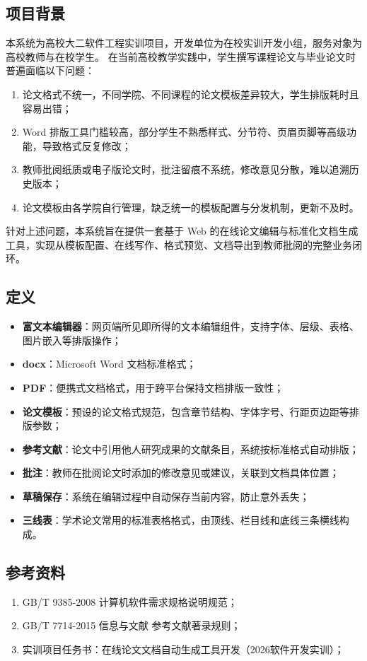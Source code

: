 \documentclass{softeng}
\begin{document}
\subsection{项目背景}
    本系统为高校大二软件工程实训项目，开发单位为在校实训开发小组，服务对象为高校教师与在校学生。
    在当前高校教学实践中，学生撰写课程论文与毕业论文时普遍面临以下问题：
    \begin{enumerate}
	    \item 论文格式不统一，不同学院、不同课程的论文模板差异较大，学生排版耗时且容易出错；
	    \item Word 排版工具门槛较高，部分学生不熟悉样式、分节符、页眉页脚等高级功能，导致格式反复修改；
	    \item 教师批阅纸质或电子版论文时，批注留痕不系统，修改意见分散，难以追溯历史版本；
	    \item 论文模板由各学院自行管理，缺乏统一的模板配置与分发机制，更新不及时。
    \end{enumerate}
    针对上述问题，本系统旨在提供一套基于 Web 的在线论文编辑与标准化文档生成工具，实现从模板配置、在线写作、格式预览、文档导出到教师批阅的完整业务闭环。
	
\subsection{定义}
	\begin{itemize}
        \item \textbf{富文本编辑器}：网页端所见即所得的文本编辑组件，支持字体、层级、表格、图片嵌入等排版操作；
        \item \textbf{docx}：Microsoft Word 文档标准格式；
	    \item \textbf{PDF}：便携式文档格式，用于跨平台保持文档排版一致性；
		\item \textbf{论文模板}：预设的论文格式规范，包含章节结构、字体字号、行距页边距等排版参数；
		\item \textbf{参考文献}：论文中引用他人研究成果的文献条目，系统按标准格式自动排版；
		\item \textbf{批注}：教师在批阅论文时添加的修改意见或建议，关联到文档具体位置；
		\item \textbf{草稿保存}：系统在编辑过程中自动保存当前内容，防止意外丢失；
		\item \textbf{三线表}：学术论文常用的标准表格格式，由顶线、栏目线和底线三条横线构成。
	\end{itemize}
	
\subsection{参考资料}
	\begin{enumerate}
		\item GB/T 9385-2008 计算机软件需求规格说明规范；
		\item GB/T 7714-2015 信息与文献 参考文献著录规则；
		\item 实训项目任务书：在线论文文档自动生成工具开发（2026软件开发实训）；
	\end{enumerate}
	
\end{document}
